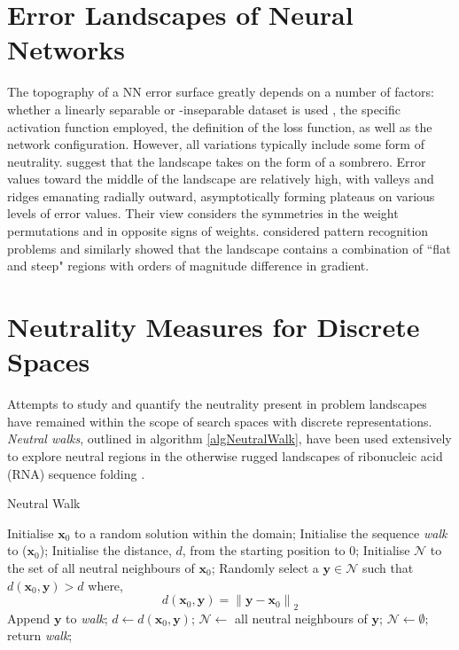 \documentclass[conference]{IEEEtran}
\renewcommand{\vec}[1]{\mathbf{#1}}
\begin{document}
\section{Error Landscapes of Neural Networks}
\label{backgroundNNEL}
\par The topography of a NN error surface greatly depends on a number of factors: whether a linearly separable or -inseparable dataset is used \cite{gallagher2000multi}, the specific activation function employed, the definition of the loss function, as well as the network configuration. However, all variations typically include some form of neutrality. \citet{denker1987large} suggest that the landscape takes on the form of a sombrero. Error values toward the middle of the landscape are relatively high, with valleys and ridges emanating radially outward, asymptotically forming plateaus on various levels of error values. Their view considers the symmetries in the weight permutations and in opposite signs of weights. \citet{hush1992error} considered pattern recognition problems and similarly showed that the landscape contains a combination of ``flat and steep" regions with orders of magnitude difference in gradient. 

\section{Neutrality Measures for Discrete Spaces}
\label{backgroundDiscreteNeutrality}
Attempts to study and quantify the neutrality present in problem landscapes have remained within the scope of search spaces with discrete representations. \textit{Neutral walks}, outlined in algorithm \ref{algNeutralWalk}, have been used extensively to explore neutral regions in the otherwise rugged landscapes of ribonucleic acid (RNA) sequence folding \cite{schuster1994sequences,gruner1996analysis}.

\begin{algorithm}[!t]
	\caption{Neutral Walk}
	\label{algNeutralWalk}
	\begin{algorithmic}
		\STATE Initialise $\vec{x}_0$ to a random solution within the domain;
		\STATE Initialise the sequence \textit{walk} to ($\vec{x}_0$);
		\STATE Initialise the distance, $d$, from the starting position to $0$;
		\STATE Initialise $\mathcal{N}$ to the set of all neutral neighbours of $\vec{x}_0$;
		\STATE Randomly select a $\vec{y} \in \mathcal{N}$ such that $d(\vec{x}_0, \vec{y}) > d$ where,
		\begin{equation} 
		\label{eqnEucl}
		d(\vec{x}_0, \vec{y}) = {\lVert \vec{y} - \vec{x}_0 \lVert}_2
		\end{equation}
		\IF{$\vec{y}$ exists}
			\STATE Append $\vec{y}$ to \textit{walk};
			\STATE $d \gets d(\vec{x}_0, \vec{y})$;
			\STATE $\mathcal{N} \gets $ all neutral neighbours of $\vec{y}$;
		\ELSE
			\STATE $\mathcal{N} \gets \emptyset$;
		\ENDIF
		\ENDWHILE			
		\STATE return \textit{walk};
	\end{algorithmic}	
\end{algorithm} 
\end{document}
